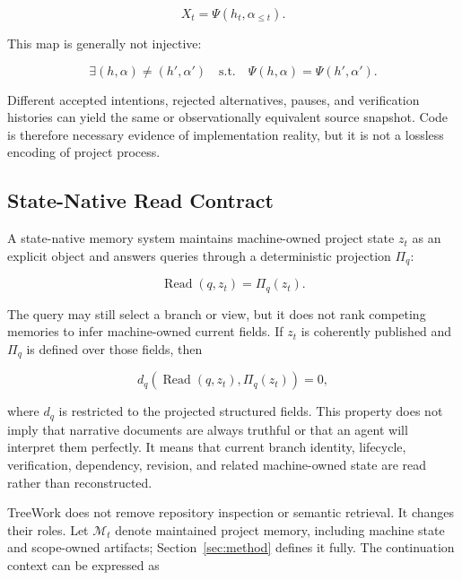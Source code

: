 \documentclass[11pt]{article}
\newcommand{\M}{\mathcal{M}}
\newcommand{\Read}{\operatorname{Read}}
\theoremstyle{definition}
\begin{document}
\begin{equation}
  X_t=\Psi(h_t,\alpha_{\leq t}).
  \label{eq:repository-result}
\end{equation}

This map is generally not injective:

\begin{equation}
  \exists (h,\alpha)\neq(h',\alpha')
  \quad\text{s.t.}\quad
  \Psi(h,\alpha)=\Psi(h',\alpha').
  \label{eq:non-injective-code}
\end{equation}

Different accepted intentions, rejected alternatives, pauses, and verification
histories can yield the same or observationally equivalent source snapshot.
Code is therefore necessary evidence of implementation reality, but it is not
a lossless encoding of project process.

\subsection{State-Native Read Contract}

A state-native memory system maintains machine-owned project state $z_t$ as an
explicit object and answers queries through a deterministic projection $\Pi_q$:

\begin{equation}
  \Read(q,z_t) = \Pi_q(z_t).
  \label{eq:state-query}
\end{equation}

The query may still select a branch or view, but it does not rank competing
memories to infer machine-owned current fields.  If $z_t$ is coherently
published and $\Pi_q$ is defined over those fields, then

\begin{equation}
  d_q\!\left(\Read(q,z_t),\Pi_q(z_t)\right)=0,
  \label{eq:projection-exactness}
\end{equation}

where $d_q$ is restricted to the projected structured fields.  This property
does not imply that narrative documents are always truthful or that an agent
will interpret them perfectly.  It means that current branch identity,
lifecycle, verification, dependency, revision, and related machine-owned state
are read rather than reconstructed.

TreeWork does not remove repository inspection or semantic retrieval.  It
changes their roles.  Let $\M_t$ denote maintained project memory, including
machine state and scope-owned artifacts; Section~\ref{sec:method} defines it
fully.  The continuation context can be expressed as
\end{document}
